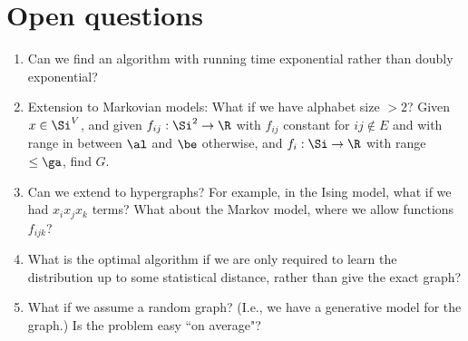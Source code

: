 \section{Open questions}
\begin{enumerate}
\item
Can we find an algorithm with running time exponential rather than doubly exponential?
\item 
Extension to Markovian models: 
What if we have alphabet size $>2$? Given $x\in \Si^V$, and given $f_{ij}:\Si^2\to \R$ with $f_{ij}$ constant for $ij\nin E$ and with range in between $\al$ and $\be$ otherwise, and $f_i:\Si\to \R$ with range $\le \ga$, find $G$.
\item
Can we extend to hypergraphs? For example, in the Ising model, what if we had $x_ix_jx_k$ terms? What about the Markov model, where we allow functions $f_{ijk}$?
\item
What is the optimal algorithm if we are only required to learn the distribution up to some statistical distance, rather than give the exact graph?
\item 
What if we assume a random graph? (I.e., we have a generative model for the graph.) Is the problem easy ``on average"?
\end{enumerate}


%
\printbibliography
%
%
